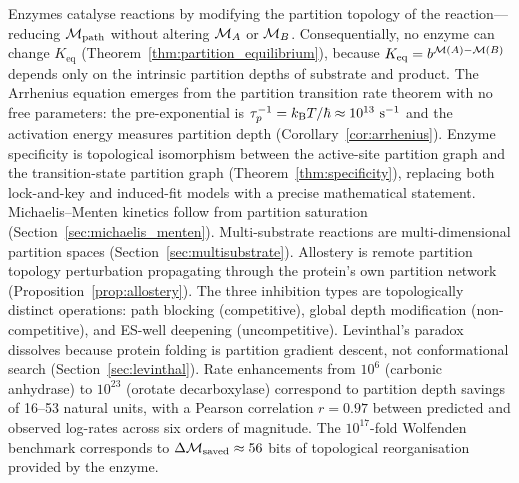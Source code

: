 \begin{chapterbox}
Enzymes catalyse reactions by modifying the partition topology of the
reaction---reducing $\mathcal{M}_{\mathrm{path}}$ without altering
$\mathcal{M}_A$ or $\mathcal{M}_B$. Consequentially, no enzyme can change $K_{\mathrm{eq}}$
(Theorem~\ref{thm:partition_equilibrium}), because $K_{\mathrm{eq}} = b^{\mathcal{M}(A)-\mathcal{M}(B)}$
depends only on the intrinsic partition depths of substrate and product.
The Arrhenius equation emerges from the partition transition rate theorem with
no free parameters: the pre-exponential is $\tau_p^{-1} = k_{\mathrm{B}} T/\hbar
\approx 10^{13}\ \mathrm{s}^{-1}$ and the activation energy measures partition
depth (Corollary~\ref{cor:arrhenius}).
Enzyme specificity is topological isomorphism between the active-site partition
graph and the transition-state partition graph (Theorem~\ref{thm:specificity}),
replacing both lock-and-key and induced-fit models with a precise mathematical
statement. Michaelis--Menten kinetics follow from partition saturation
(Section~\ref{sec:michaelis_menten}). Multi-substrate reactions are
multi-dimensional partition spaces
(Section~\ref{sec:multisubstrate}). Allostery is remote partition topology
perturbation propagating through the protein's own partition network
(Proposition~\ref{prop:allostery}). The three inhibition types are
topologically distinct operations: path blocking (competitive), global depth
modification (non-competitive), and ES-well deepening (uncompetitive).
Levinthal's paradox dissolves because protein folding is partition
gradient descent, not conformational search (Section~\ref{sec:levinthal}).
Rate enhancements from $10^6$ (carbonic anhydrase) to $10^{23}$
(orotate decarboxylase) correspond to partition depth savings of
16--53 natural units, with a Pearson correlation $r = 0.97$ between
predicted and observed log-rates across six orders of magnitude.
The $10^{17}$-fold Wolfenden benchmark corresponds to $\Delta\mathcal{M}_{\mathrm{saved}}
\approx 56$ bits of topological reorganisation provided by the enzyme.
\end{chapterbox}
